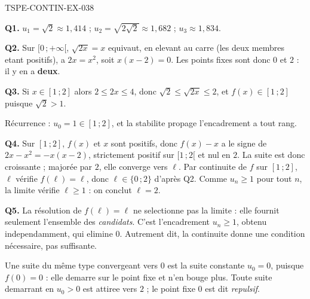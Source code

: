 \begin{corrige}{TSPE-CONTIN-EX-038}

\textbf{Q1.} $u_1 = \sqrt2 \approx 1{,}414$ ; $u_2 = \sqrt{2\sqrt2} \approx 1{,}682$ ; $u_3 \approx 1{,}834$.

\textbf{Q2.} Sur $[0\,;+\infty[$, $\sqrt{2x} = x$ equivaut, en elevant au carre (les deux membres etant positifs), a $2x = x^2$, soit $x(x-2) = 0$. Les points fixes sont donc $0$ et $2$ : il y en a \textbf{deux}.

\textbf{Q3.} Si $x \in [1\,;2]$ alors $2 \leq 2x \leq 4$, donc $\sqrt2 \leq \sqrt{2x} \leq 2$, et $f(x) \in [1\,;2]$ puisque $\sqrt2 > 1$.

Récurrence : $u_0 = 1 \in [1\,;2]$, et la stabilite propage l'encadrement a tout rang.

\textbf{Q4.} Sur $[1\,;2]$, $f(x)$ et $x$ sont positifs, donc $f(x) - x$ a le signe de $2x - x^2 = -x(x-2)$, strictement positif sur $[1\,;2[$ et nul en $2$. La suite est donc croissante ; majorée par $2$, elle converge vers $\ell$. Par continuite de $f$ sur $[1\,;2]$, $\ell$ vérifie $f(\ell) = \ell$, donc $\ell \in \{0\,;2\}$ d'après Q2. Comme $u_n \geq 1$ pour tout $n$, la limite vérifie $\ell \geq 1$ : on conclut $\ell = 2$.

\textbf{Q5.} La résolution de $f(\ell) = \ell$ ne selectionne pas la limite : elle fournit seulement l'ensemble des \emph{candidats}. C'est l'encadrement $u_n \geq 1$, obtenu independamment, qui elimine $0$. Autrement dit, la continuite donne une condition nécessaire, pas suffisante.

Une suite du même type convergeant vers $0$ est la suite constante $u_0 = 0$, puisque $f(0) = 0$ : elle demarre sur le point fixe et n'en bouge plus. Toute suite demarrant en $u_0 > 0$ est attiree vers $2$ ; le point fixe $0$ est dit \emph{repulsif}.
\end{corrige}
